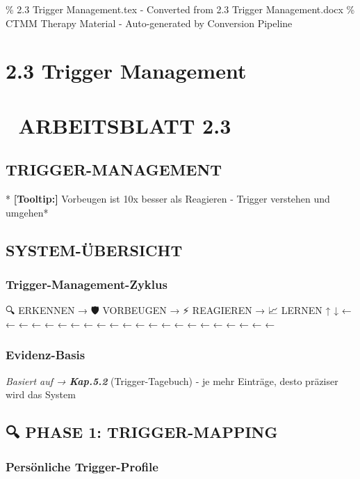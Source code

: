 \% 2.3 Trigger Management.tex - Converted from 2.3 Trigger Management.docx
\% CTMM Therapy Material - Auto-generated by Conversion Pipeline

\section{2.3 Trigger Management}
\label{sec:2-3-trigger-management}

\section{🎢 \textbf{ARBEITSBLATT 2.3}}
\subsection{\textbf{TRIGGER-MANAGEMENT}}

*\textcolor{ctmmYellow}{\faLightbulb} \textbf{[Tooltip:]} Vorbeugen ist 10x besser als Reagieren -
\textcolor{ctmmRed}{Trigger} verstehen und umgehen*

\subsection{\textcolor{ctmmGreen}{\faBullseye} \textbf{SYSTEM-ÜBERSICHT}}

\subsubsection{\textbf{\textcolor{ctmmRed}{Trigger}-Management-Zyklus}}

🔍 ERKENNEN → 🛡️ VORBEUGEN → ⚡ REAGIEREN → 📈 LERNEN
↑                                           ↓
← ← ← ← ← ← ← ← ← ← ← ← ← ← ← ← ← ← ← ← ← ←

\subsubsection{\textbf{Evidenz-Basis}}

\textit{\textcolor{ctmmYellow}{\faLightbulb} Basiert auf → \textcolor{ctmmBlue}{\faEdit} \textbf{Kap.5.2}}\* (\textcolor{ctmmRed}{Trigger}-Tagebuch) - je mehr
Einträge, desto präziser wird das System\*

\subsection{🔍 \textbf{PHASE 1: TRIGGER-MAPPING}}

\subsubsection{\textbf{Persönliche \textcolor{ctmmRed}{Trigger}-Profile}}

